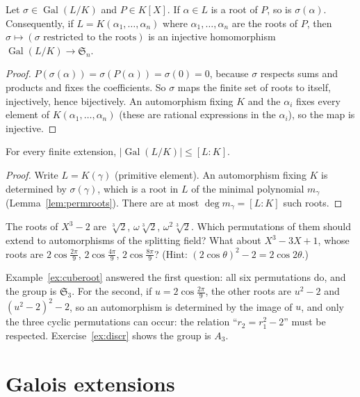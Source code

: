 \begin{lemma}\label{lem:permroots}
Let $\sigma\in\operatorname{Gal}(L/K)$ and $P\in K[X]$. If $\alpha\in L$ is a root of $P$, so is $\sigma(\alpha)$. Consequently, if $L=K(\alpha_1,\dots,\alpha_n)$ where $\alpha_1,\dots,\alpha_n$ are the roots of $P$, then $\sigma\mapsto(\sigma\text{ restricted to the roots})$ is an injective homomorphism $\operatorname{Gal}(L/K)\to\mathfrak S_n$.
\end{lemma}
\begin{proof}
$P(\sigma(\alpha))=\sigma(P(\alpha))=\sigma(0)=0$, because $\sigma$ respects sums and products and fixes the coefficients. So $\sigma$ maps the finite set of roots to itself, injectively, hence bijectively. An automorphism fixing $K$ and the $\alpha_i$ fixes every element of $K(\alpha_1,\dots,\alpha_n)$ (these are rational expressions in the $\alpha_i$), so the map is injective.
\end{proof}

\begin{proposition}\label{prop:autbound}
For every finite extension, $|\operatorname{Gal}(L/K)|\le[L:K]$.
\end{proposition}
\begin{proof}
Write $L=K(\gamma)$ (primitive element). An automorphism fixing $K$ is determined by $\sigma(\gamma)$, which is a root in $L$ of the minimal polynomial $m_\gamma$ (Lemma~\ref{lem:permroots}). There are at most $\deg m_\gamma=[L:K]$ such roots.
\end{proof}

\begin{think}
The roots of $X^3-2$ are $\sqrt[3]2$, $\omega\sqrt[3]2$, $\omega^2\sqrt[3]2$. Which permutations of them should extend to automorphisms of the splitting field? What about $X^3-3X+1$, whose roots are $2\cos\frac{2\pi}9$, $2\cos\frac{4\pi}9$, $2\cos\frac{8\pi}9$? (Hint: $(2\cos\theta)^2-2=2\cos2\theta$.)
\end{think}

Example~\ref{ex:cuberoot} answered the first question: all six permutations do, and the group is $\mathfrak S_3$. For the second, if $u=2\cos\frac{2\pi}9$, the other roots are $u^2-2$ and $(u^2-2)^2-2$, so an automorphism is determined by the image of $u$, and only the three cyclic permutations can occur: the relation ``$r_2=r_1^2-2$'' must be respected. Exercise~\ref{ex:discr} shows the group is $A_3$.

\section{Galois extensions}

